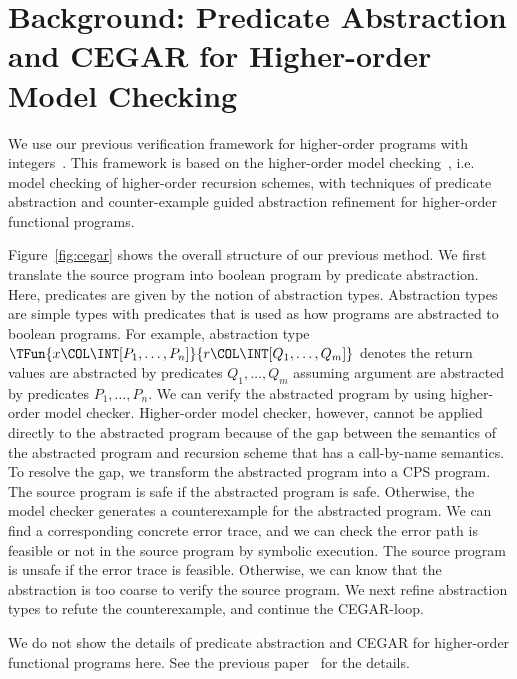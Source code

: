 \section{Background: Predicate Abstraction and CEGAR for Higher-order Model Checking}
\label{sec:model-check}
We use our previous verification framework for higher-order
programs with integers~\cite{KobayashiPLDI2011}.  This framework is
based on the higher-order model
checking~\cite{Ong2006,KobayashiPOPL2009}, i.e. model checking of
higher-order recursion schemes, with techniques of predicate abstraction
and counter-example guided abstraction refinement for higher-order
functional programs.

Figure~\ref{fig:cegar} shows the overall structure of our previous
method.  We first translate the source program into boolean program by
predicate abstraction.  Here, predicates are given by the notion of
abstraction types.  Abstraction types are simple types with predicates
that is used as how programs are abstracted to boolean programs.  For
example, abstraction type
$\TFun{x\COL\INT[P_1,\dots,P_n]}{r\COL\INT[Q_1,\dots,Q_m]}$ denotes the
return values are abstracted by predicates $Q_1,\dots,Q_m$ assuming
argument are abstracted by predicates $P_1,\dots, P_n$.  We can verify
the abstracted program by using higher-order model checker.
Higher-order model checker, however, cannot be applied directly to the
abstracted program because of the gap between the semantics of the
abstracted program and recursion scheme that has a call-by-name
semantics.  To resolve the gap, we transform the abstracted program into
a CPS program.  The source program is safe if the abstracted program is
safe.  Otherwise, the model checker generates a counterexample for the
abstracted program.  We can find a corresponding concrete error trace,
and we can check the error path is feasible or not in the source program
by symbolic execution.  The source program is unsafe if the error trace
is feasible.  Otherwise, we can know that the abstraction is too coarse
to verify the source program.  We next refine abstraction types to
refute the counterexample, and continue the CEGAR-loop.

We do not show the details of predicate abstraction and CEGAR for higher-order functional programs here.
See the previous paper~\cite{KobayashiPLDI2011} for the details.


